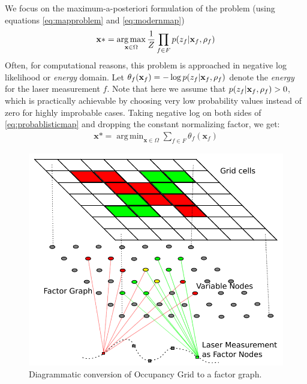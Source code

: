 \documentclass[letterpaper, 10 pt, conference]{ieeeconf} %
\DeclareMathOperator*{\argmin}{arg\,min}
\DeclareMathOperator*{\argmax}{arg\,max}
\newcommand{\vect}[1]{\mathbf{#1}}
\newcommand{\field}[1]{\mathbb{#1}}
\newcommand{\Real}[0]{\field{R}}
\begin{document}

We focus on the maximum-a-posteriori formulation of the problem (using equations \eqref{eq:mapproblem} and \eqref{eq:modernmap}) 
\begin{align}
  \vect{x}* = \argmax_{\vect{x} \in \Omega} \frac{1}{Z} \prod_{f \in F} p(z_f|\map_f, \rho_f)
  \label{eq:probablisticmap}
\end{align}
Often, for computational reasons, this problem is approached in negative log
likelihood or \emph{energy} domain. Let 
$\theta_f(\vect{x}_f) = - \log p(z_f|\map_f, \rho_f)$ 
denote the \emph{energy} for the laser measurement $f$. Note that here we
assume that $p(z_f|\map_f, \rho_f) > 0$, which is practically achievable by
choosing very low probability values instead of zero for highly improbable
cases.  Taking negative log on both sides of \eqref{eq:probablisticmap} and
dropping the constant normalizing factor, we get:
\begin{align}
  \vect{x}* = \argmin_{\vect{x} \in \Omega} \sum_{f \in F} \theta_f(\vect{x}_f)
\end{align}
\begin{figure}
  \includegraphics[width=\columnwidth]{../figures/factorgraph/factorgraph.pdf}
  \caption{Diagrammatic conversion of Occupancy Grid to a factor graph.}
  \label{fig:factor-graph}
\end{figure}
\end{document}
